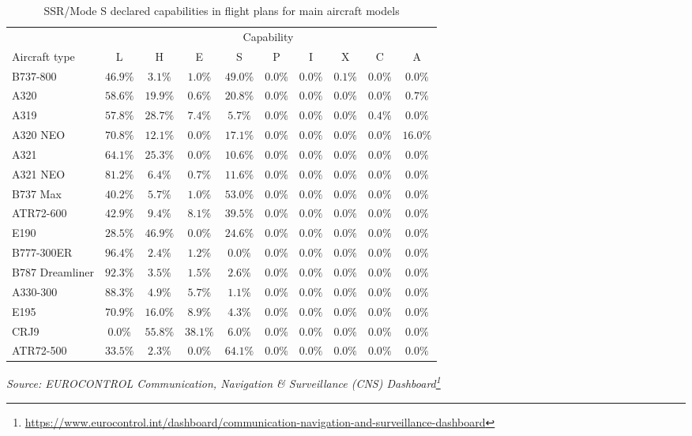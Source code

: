 \documentclass[
  11pt,
  a4paper,
]{book}
\DeclareRobustCommand{\href}[2]{#2\footnote{\url{#1}}}
\begin{document}
\hypertarget{tbl-ssr-aircraft}{}
\setlength{\LTpost}{0mm}
\begin{longtable}{lccccccccc}
\caption{\label{tbl-ssr-aircraft}SSR/Mode S declared capabilities in flight plans for main aircraft
models }\tabularnewline

\toprule
 & \multicolumn{9}{c}{Capability} \\ 
\cmidrule(lr){2-10}
Aircraft type & L & H & E & S & P & I & X & C & A \\ 
\midrule
B737-800 & $46.9\%$ & $3.1\%$ & $1.0\%$ & $49.0\%$ & $0.0\%$ & $0.0\%$ & $0.1\%$ & $0.0\%$ & $0.0\%$ \\ 
A320 & $58.6\%$ & $19.9\%$ & $0.6\%$ & $20.8\%$ & $0.0\%$ & $0.0\%$ & $0.0\%$ & $0.0\%$ & $0.7\%$ \\ 
A319 & $57.8\%$ & $28.7\%$ & $7.4\%$ & $5.7\%$ & $0.0\%$ & $0.0\%$ & $0.0\%$ & $0.4\%$ & $0.0\%$ \\ 
A320 NEO & $70.8\%$ & $12.1\%$ & $0.0\%$ & $17.1\%$ & $0.0\%$ & $0.0\%$ & $0.0\%$ & $0.0\%$ & $16.0\%$ \\ 
A321 & $64.1\%$ & $25.3\%$ & $0.0\%$ & $10.6\%$ & $0.0\%$ & $0.0\%$ & $0.0\%$ & $0.0\%$ & $0.0\%$ \\ 
A321 NEO & $81.2\%$ & $6.4\%$ & $0.7\%$ & $11.6\%$ & $0.0\%$ & $0.0\%$ & $0.0\%$ & $0.0\%$ & $0.0\%$ \\ 
B737 Max & $40.2\%$ & $5.7\%$ & $1.0\%$ & $53.0\%$ & $0.0\%$ & $0.0\%$ & $0.0\%$ & $0.0\%$ & $0.0\%$ \\ 
ATR72-600 & $42.9\%$ & $9.4\%$ & $8.1\%$ & $39.5\%$ & $0.0\%$ & $0.0\%$ & $0.0\%$ & $0.0\%$ & $0.0\%$ \\ 
E190 & $28.5\%$ & $46.9\%$ & $0.0\%$ & $24.6\%$ & $0.0\%$ & $0.0\%$ & $0.0\%$ & $0.0\%$ & $0.0\%$ \\ 
B777-300ER & $96.4\%$ & $2.4\%$ & $1.2\%$ & $0.0\%$ & $0.0\%$ & $0.0\%$ & $0.0\%$ & $0.0\%$ & $0.0\%$ \\ 
B787 Dreamliner & $92.3\%$ & $3.5\%$ & $1.5\%$ & $2.6\%$ & $0.0\%$ & $0.0\%$ & $0.0\%$ & $0.0\%$ & $0.0\%$ \\ 
A330-300 & $88.3\%$ & $4.9\%$ & $5.7\%$ & $1.1\%$ & $0.0\%$ & $0.0\%$ & $0.0\%$ & $0.0\%$ & $0.0\%$ \\ 
E195 & $70.9\%$ & $16.0\%$ & $8.9\%$ & $4.3\%$ & $0.0\%$ & $0.0\%$ & $0.0\%$ & $0.0\%$ & $0.0\%$ \\ 
CRJ9 & $0.0\%$ & $55.8\%$ & $38.1\%$ & $6.0\%$ & $0.0\%$ & $0.0\%$ & $0.0\%$ & $0.0\%$ & $0.0\%$ \\ 
ATR72-500 & $33.5\%$ & $2.3\%$ & $0.0\%$ & $64.1\%$ & $0.0\%$ & $0.0\%$ & $0.0\%$ & $0.0\%$ & $0.0\%$ \\ 
\bottomrule
\end{longtable}
\begin{minipage}{\linewidth}
\emph{Source: \href{https://www.eurocontrol.int/dashboard/communication-navigation-and-surveillance-dashboard}{EUROCONTROL Communication, Navigation \& Surveillance (CNS) Dashboard}}\\
\end{minipage}
\end{document}
